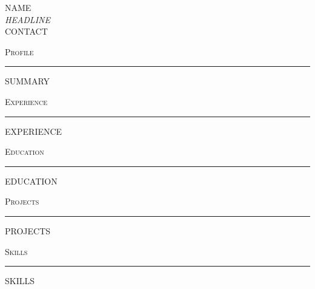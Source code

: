\documentclass[11pt,a4paper]{article}
\renewcommand{\section}[1]{\par\vspace{14pt}\begin{center}{\scshape\large #1}\\[-4pt]\rule{0.18\textwidth}{0.4pt}\end{center}\vspace{2pt}}
\begin{document}
\begin{center}
{\Huge\scshape {{NAME}}}\\[6pt]
{\itshape {{HEADLINE}}}\\[6pt]
{\small {{CONTACT}}}
\end{center}

\section{Profile}
{{SUMMARY}}

\section{Experience}
{{EXPERIENCE}}

\section{Education}
{{EDUCATION}}

\section{Projects}
{{PROJECTS}}

\section{Skills}
{{SKILLS}}
\end{document}
